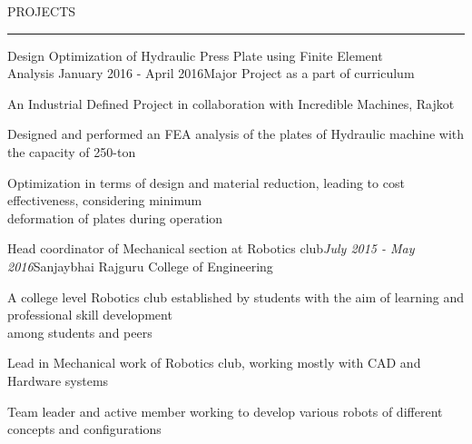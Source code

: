 \documentclass{resume} %
\renewenvironment{rSection}[1]{
\sectionskip
\textcolor{TsinghuaPurple}{\MakeUppercase{#1}}
\sectionlineskip
\hrule
\begin{list}{}{
\setlength{\leftmargin}{0em}
}
\item[]
}{
\end{list}
}
\begin{document}

\begin{rSection}{PROJECTS}

\begin{rSubsection}{Design Optimization of Hydraulic Press Plate using Finite Element
\\Analysis} {January 2016 - April 2016}{Major Project as a part of curriculum}{}

\item An Industrial Defined Project in collaboration with Incredible Machines, Rajkot
\item Designed and performed an FEA analysis of the plates of Hydraulic machine with the capacity of 250-ton    
\item Optimization in terms of design and material reduction, leading to cost effectiveness, considering minimum \\deformation of plates during operation 
 
\end{rSubsection}  


\begin{rSubsection}{Head coordinator of Mechanical section at Robotics club}{\textit{July 2015 - May 2016}}{Sanjaybhai Rajguru College of Engineering}{} 
\item A college level Robotics club established by students with the aim of learning and professional skill development \\among students and peers            
\item Lead in Mechanical work of Robotics club, working mostly with CAD and Hardware systems
\item Team leader and active member working to develop various robots of different concepts and configurations     
\end{rSubsection}

\end{rSection}



\end{document}
